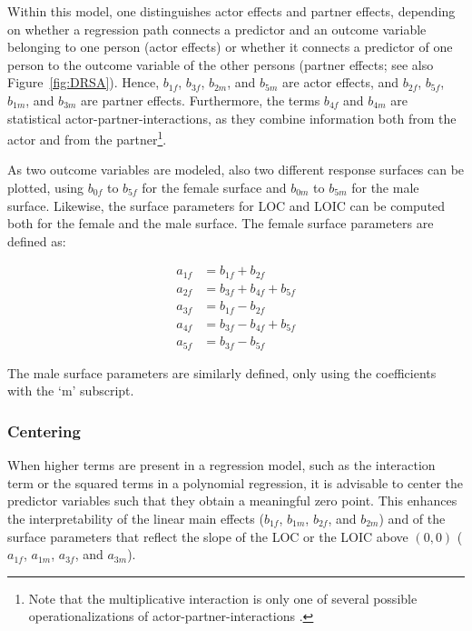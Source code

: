 \documentclass[jou,a4paper,draftfirst]{apa6}
\begin{document}
Within this model, one distinguishes actor effects and partner effects, depending on whether a regression path connects a predictor and an outcome variable belonging to one person (actor effects) or whether it connects a predictor of one person to the outcome variable of the other persons (partner effects; see also Figure~\ref{fig:DRSA}). Hence, $b_{1f}$, $b_{3f}$, $b_{2m}$, and $b_{5m}$ are actor effects, and $b_{2f}$, $b_{5f}$, $b_{1m}$, and $b_{3m}$ are partner effects. Furthermore, the terms $b_{4f}$ and $b_{4m}$ are statistical actor-partner-interactions, as they combine information both from the actor and from the partner\footnote{Note that the multiplicative interaction is only one of several possible operationalizations of actor-partner-interactions \parencite{kenny_partner_1999}.}.

\begin{figure*}[ht!]
\centering
{}
\caption{The dyadic RSA path model. Black solid paths are actor effects, dashed paths are partner effects, and the dotted paths are statistical partner interactions. Intercepts are not displayed. Figure available at \url{https://osf.io/ftsrd/}, under a CC-BY4.0 license.}
\label{fig:DRSA}
\end{figure*}

As two outcome variables are modeled, also two different response surfaces can be plotted, using $b_{0f}$ to $b_{5f}$ for the female surface and $b_{0m}$ to $b_{5m}$ for the male surface. Likewise, the surface parameters for LOC and LOIC can be computed both for the female and the male surface. The female surface parameters are defined as:

\begin{equation} 
\label{eq:female_SP}
\begin{split}
a_{1f} &= b_{1f} + b_{2f}\\
a_{2f} &= b_{3f} + b_{4f} + b_{5f}\\
a_{3f} &= b_{1f} - b_{2f}\\
a_{4f} &= b_{3f} - b_{4f} + b_{5f}\\
a_{5f} &= b_{3f} - b_{5f}
\end{split}
\end{equation}

The male surface parameters are similarly defined, only using the coefficients with the `m' subscript.

\subsubsection{Centering}
When higher terms are present in a regression model, such as the interaction term or the squared terms in a polynomial regression, it is advisable to center the predictor variables such that they obtain a meaningful zero point. This enhances the interpretability of the linear main effects ($b_{1f}$, $b_{1m}$, $b_{2f}$, and $b_{2m}$) and of the surface parameters that reflect the slope of the LOC or the LOIC above $(0,0)$ ($a_{1f}$, $a_{1m}$, $a_{3f}$, and $a_{3m}$).
\end{document}
